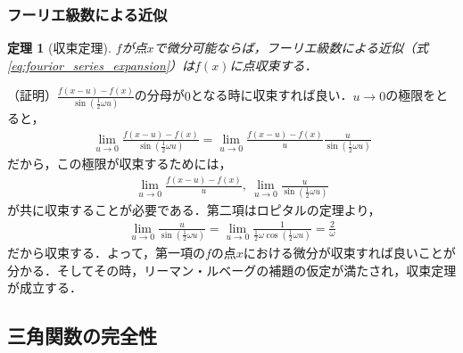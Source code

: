 \documentclass[dvipdfmx,graphicx,14pt]{beamer}
\newtheorem{mytheorem}{定理}
\begin{document}
\begin{frame}[c]
    \frametitle{フーリエ級数による近似}
    \begin{mytheorem}[収束定理]
        $f$が点$x$で微分可能ならば，フーリエ級数による近似（式\eqref{eq:fourior_series_expansion}）は$f(x)$に点収束する．
    \end{mytheorem}
    \scriptsize
    （証明）$\frac{f(x-u) - f(x)}{\sin\left(\frac{1}{2}\omega u\right)}$の分母が$0$となる時に収束すれば良い．$u\to0$の極限をとると，
    \begin{align*}
        \lim_{u\to 0} \frac{f(x-u) - f(x)}{\sin\left(\frac{1}{2}\omega u\right)} = \lim_{u\to 0} \frac{f(x-u) - f(x)}{u} \frac{u}{\sin\left(\frac{1}{2}\omega u\right)}
    \end{align*}
    だから，この極限が収束するためには，
    \begin{align*}
        \lim_{u\to 0} \frac{f(x-u) - f(x)}{u},\ \lim_{u\to 0} \frac{u}{\sin\left(\frac{1}{2}\omega u\right)}
    \end{align*}
    が共に収束することが必要である．第二項はロピタルの定理より，
    \begin{align*}
        \lim_{u\to 0} \frac{u}{\sin\left(\frac{1}{2}\omega u\right)} = \lim_{u\to 0} \frac{1}{\frac{1}{2}\omega \cos\left(\frac{1}{2}\omega u\right)} = \frac{2}{\omega}
    \end{align*}
    だから収束する．よって，第一項の$f$の点$x$における微分が収束すれば良いことが分かる．そしてその時，リーマン・ルベーグの補題の仮定が満たされ，収束定理が成立する．
\end{frame}

\subsection{三角関数の完全性}
\end{document}
